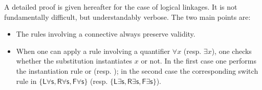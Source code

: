 A detailed proof is given hereafter for the case of logical linkages. It is not
fundamentally difficult, but understandably verbose. The two main points are:
\begin{itemize}
\item The rules involving a connective always preserve validity.
\item When one can apply a rule involving a quantifier $\forall x$ (resp.
  $\exists x$), one checks whether the substitution instantiates $x$ or not. In
  the first case one performs the instantiation rule  or
   (resp. ); in the second case the
  corresponding switch rule in {\small $\{\mathsf{L\forall s}, \mathsf{R\forall
  s}, \mathsf{F\forall s}\}$} (resp. {\small $\{\mathsf{L\exists s},
  \mathsf{R\exists s}, \mathsf{F\exists s}\}$}).
\end{itemize}
